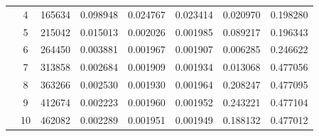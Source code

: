 \begin{tabular}{c c |  c  c  c  c  c }
 & 4 & 165634 & 0.098948 & 0.024767 & 0.023414 & 0.020970 & 0.198280 \\
 & 5 & 215042 & 0.015013 & 0.002026 & 0.001985 & 0.089217 & 0.196343 \\
 & 6 & 264450 & 0.003881 & 0.001967 & 0.001907 & 0.006285 & 0.246622 \\
 & 7 & 313858 & 0.002684 & 0.001909 & 0.001934 & 0.013068 & 0.477056 \\
 & 8 & 363266 & 0.002530 & 0.001930 & 0.001964 & 0.208247 & 0.477095 \\
 & 9 & 412674 & 0.002223 & 0.001960 & 0.001952 & 0.243221 & 0.477104 \\
 & 10 & 462082 & 0.002289 & 0.001951 & 0.001949 & 0.188132 & 0.477012 \\
\hline
\end{tabular}

